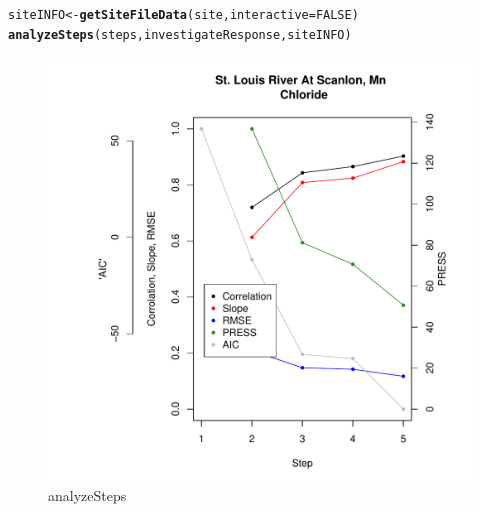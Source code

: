 \documentclass[a4paper,11pt]{article}\usepackage[]{graphicx}\usepackage[]{color}
\makeatletter
\def\maxwidth{ %
  \ifdim\Gin@nat@width>\linewidth
    \linewidth
  \else
    \Gin@nat@width
  \fi
}
\newcommand{\hlnum}[1]{\textcolor[rgb]{0.686,0.059,0.569}{#1}}%
\newcommand{\hlstd}[1]{\textcolor[rgb]{0.345,0.345,0.345}{#1}}%
\newcommand{\hlkwb}[1]{\textcolor[rgb]{0.69,0.353,0.396}{#1}}%
\newcommand{\hlkwc}[1]{\textcolor[rgb]{0.333,0.667,0.333}{#1}}%
\newcommand{\hlkwd}[1]{\textcolor[rgb]{0.737,0.353,0.396}{\textbf{#1}}}%
\newenvironment{kframe}{%
 \def\at@end@of@kframe{}%
 \ifinner\ifhmode%
  \def\at@end@of@kframe{\end{minipage}}%
  \begin{minipage}{\columnwidth}%
 \fi\fi%
 \def\FrameCommand##1{\hskip\@totalleftmargin \hskip-\fboxsep
 \colorbox{shadecolor}{##1}\hskip-\fboxsep
     \hskip-\linewidth \hskip-\@totalleftmargin \hskip\columnwidth}%
 \MakeFramed {\advance\hsize-\width
   \@totalleftmargin\z@ \linewidth\hsize
   \@setminipage}}%
 {\par\unskip\endMakeFramed%
 \at@end@of@kframe}
\newenvironment{knitrout}{}{} %
\makeatother
\begin{document}
\begin{knitrout}
\color{fgcolor}\begin{kframe}
\begin{alltt}
\hlstd{siteINFO} \hlkwb{<-} \hlkwd{getSiteFileData}\hlstd{(site,} \hlkwc{interactive}\hlstd{=}\hlnum{FALSE}\hlstd{)}
\hlkwd{analyzeSteps}\hlstd{(steps, investigateResponse,siteINFO)}
\end{alltt}
\end{kframe}\begin{figure}[]

\includegraphics[width=\maxwidth]{figure/analyzeSteps} \caption[analyzeSteps]{analyzeSteps\label{fig:analyzeSteps}}
\end{figure}


\end{knitrout}


\FloatBarrier
\end{document}
